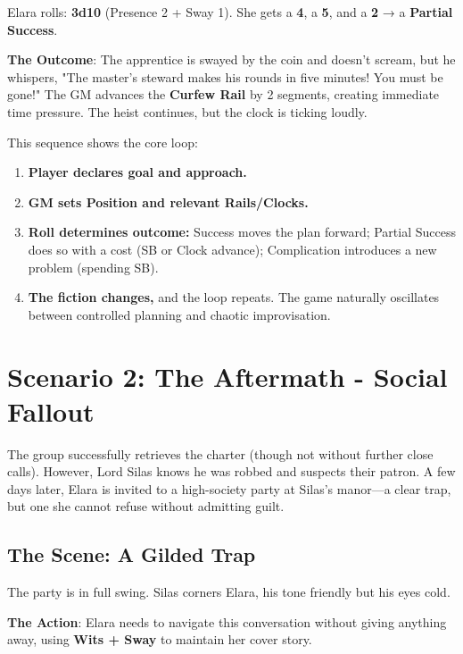 Elara rolls: \textbf{3d10} (Presence 2 + Sway 1). She gets a \textbf{4}, a \textbf{5}, and a \textbf{2} → a \textbf{Partial Success}.

\textbf{The Outcome}: The apprentice is swayed by the coin and doesn't scream, but he whispers, "The master's steward makes his rounds in five minutes! You must be gone!" The GM advances the \textbf{Curfew Rail} by 2 segments, creating immediate time pressure. The heist continues, but the clock is ticking loudly.

\begin{tcolorbox}[title=Heist Flow Summary, colback=blue!5!white, colframe=blue!75!black, fonttitle=\bfseries]
This sequence shows the core loop:
\begin{enumerate}
    \item \textbf{Player declares goal and approach.}
    \item \textbf{GM sets Position and relevant Rails/Clocks.}
    \item \textbf{Roll determines outcome:} Success moves the plan forward; Partial Success does so with a cost (SB or Clock advance); Complication introduces a new problem (spending SB).
    \item \textbf{The fiction changes,} and the loop repeats. The game naturally oscillates between controlled planning and chaotic improvisation.
\end{enumerate}
\end{tcolorbox}

\section*{Scenario 2: The Aftermath - Social Fallout}

The group successfully retrieves the charter (though not without further close calls). However, Lord Silas knows he was robbed and suspects their patron. A few days later, Elara is invited to a high-society party at Silas's manor---a clear trap, but one she cannot refuse without admitting guilt.

\subsection*{The Scene: A Gilded Trap}

The party is in full swing. Silas corners Elara, his tone friendly but his eyes cold.

\textbf{The Action}: Elara needs to navigate this conversation without giving anything away, using \textbf{Wits + Sway} to maintain her cover story.


